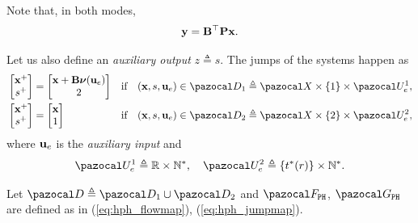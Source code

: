 Note that, in both modes, 
%
\begin{equation}
	\mathbf{y} = \mathbf{B}^\top\mathbf{P}\mathbf{x}.
\end{equation}
%

Let us also define an \textit{auxiliary output} $z\triangleq s$. The jumps of the systems happen as
%
\begin{align}
	&\begin{bmatrix}
	\xb^+\\s^+
	\end{bmatrix} = \begin{bmatrix}
	\xb+\Bb\bm\nu(\ub_e)\\2
	\end{bmatrix} &&\text{if}\quad(\xb,s,\ub_e)\in\D_1\triangleq\X\times\{1\}\times\U_e^1,\\
	&\begin{bmatrix}
	\xb^+\\s^+
	\end{bmatrix} = \begin{bmatrix}
	\xb\\1
	\end{bmatrix} &&\text{if}\quad(\xb,s,\ub_e)\in\D_2\triangleq\X\times\{2\}\times\U_e^2,
\end{align}
%
where $\mathbf{u}_e$ is the \textit{auxiliary input} and 
%
\begin{equation}
	\U_e^1 \triangleq\R\times\mathbb{N}^*,\quad\U_e^2 \triangleq\{t^*(r)\}\times\mathbb{N}^*.
\end{equation}
%

Let $\D\triangleq\D_1\cup\D_2$ and $\F_{\tt PH}$, $\G_{\tt PH}$ are defined as in (\ref{eq:hph_flowmap}), (\ref{eq:hph_jumpmap}).
%

